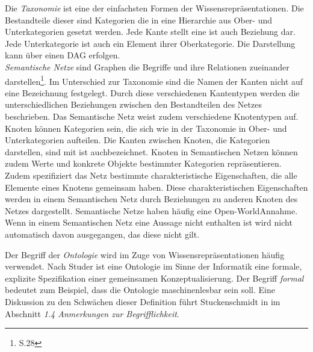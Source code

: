 Die \textit{Taxonomie} ist eine der einfachsten Formen der Wissensrepräsentationen. Die Bestandteile dieser sind Kategorien die in eine Hierarchie aus Ober- und Unterkategorien gesetzt werden. Jede Kante stellt eine \glqq ist auch \grqq Beziehung dar. Jede Unterkategorie ist auch ein Element ihrer Oberkategorie. Die Darstellung kann über einen DAG erfolgen.\\ %
\textit{Semantische Netze} \glqq sind Graphen die Begriffe und ihre Relationen zueinander darstellen\grqq\footnote{\cite{STU09} S.28}. Im Unterschied zur Taxonomie sind die Namen der Kanten nicht auf eine Bezeichnung festgelegt. Durch diese verschiedenen Kantentypen werden die unterschiedlichen Beziehungen zwischen den Bestandteilen des Netzes beschrieben. Das Semantische Netz weist zudem verschiedene Knotentypen auf. Knoten können Kategorien sein, die sich wie in der Taxonomie in Ober- und Unterkategorien aufteilen. Die Kanten zwischen Knoten, die Kategorien darstellen, sind mit \glqq ist auch\grqq bezeichnet. Knoten in Semantischen Netzen können zudem Werte und konkrete Objekte bestimmter Kategorien repräsentieren. Zudem spezifiziert das Netz bestimmte charakteristische Eigenschaften, die alle Elemente eines Knotens gemeinsam haben. Diese charakteristischen Eigenschaften werden in einem Semantischen Netz durch Beziehungen zu anderen Knoten des Netzes dargestellt. Semantische Netze haben häufig eine \glq Open-World\grq  Annahme. Wenn in einem Semantischen Netz eine Aussage nicht enthalten ist wird nicht automatisch davon ausgegangen, das diese nicht gilt.

Der Begriff der \textit{Ontologie} wird im Zuge von Wissensrepräsentationen häufig verwendet. Nach Studer \cite{STBEFE98} ist eine Ontologie im Sinne der Informatik eine \glq formale, explizite Spezifikation einer gemeinsamen Konzeptualisierung\grq. Der Begriff \textit{formal} bedeutet zum Beispiel, dass die Ontologie maschinenlesbar sein soll. Eine Diskussion zu den Schwächen dieser Definition führt Stuckenschmidt in \cite{STU09} im Abschnitt \textit{1.4 Anmerkungen zur Begrifflichkeit}. 

